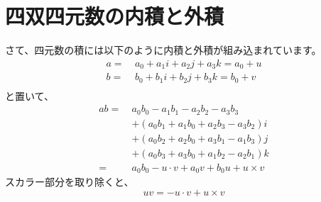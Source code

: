 \documentclass[a4paper,12pt,notitlepage]{jsreport}
\begin{document}
\section{四双四元数の内積と外積}

さて、四元数の積には以下のように内積と外積が組み込まれています。
\begin{equation}
  \begin{split}
    a=~&a_0+a_1i+a_2j+a_3k=a_0+u\\
    b=~&b_0+b_1i+b_2j+b_3k=b_0+v\\
  \end{split}
\end{equation}
と置いて、
\begin{equation}
  \begin{split}
    ab=~&a_0b_0-a_1b_1-a_2b_2-a_3b_3\\
    &+(a_0b_1+a_1b_0+a_2b_3-a_3b_2)i\\
    &+(a_0b_2+a_2b_0+a_3b_1-a_1b_3)j\\
    &+(a_0b_3+a_3b_0+a_1b_2-a_2b_1)k\\
    = ~ & a_0 b_0 - u \cdot v + a_0 v + b_0 u + u \times v
  \end{split}
\end{equation}
スカラー部分を取り除くと、
\begin{equation}
  uv=-u\cdot v+u\times v
\end{equation}
\end{document}
